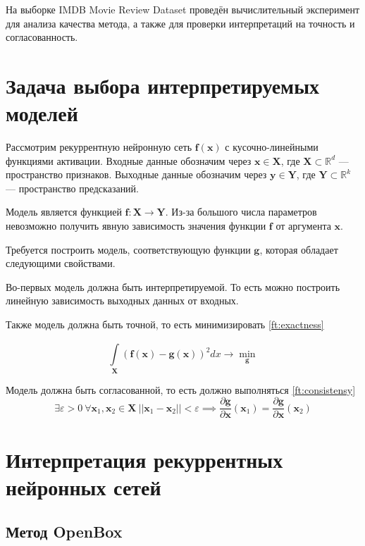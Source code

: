 \documentclass[a4paper, 12pt]{article}
\begin{document}
На выборке IMDB Movie Review Dataset \cite{maas-EtAl:2011:ACL-HLT2011} проведён вычислительный эксперимент для анализа качества метода, а также для проверки интерпретаций на точность и согласованность. 

\section{Задача выбора интерпретируемых моделей}
Рассмотрим рекуррентную нейронную сеть $\mathbf{f}(\mathbf{x})$ с кусочно-линейными функциями активации. Входные данные обозначим через $\mathbf{x} \in \mathbf{X}$, где $\mathbf{X} \subset \mathbb{R}^d$ --- пространство признаков. Выходные данные обозначим через $\mathbf{y} \in \mathbf{Y}$, где $\mathbf{Y} \subset \mathbb{R}^k$ --- пространство предсказаний.

Модель является функцией $\mathbf{f}: \mathbf{X} \to \mathbf{Y}$. Из-за большого числа параметров невозможно получить явную зависимость значения функции $\mathbf{f}$ от аргумента $\mathbf{x}$.

Требуется построить модель, соответствующую функции $\mathbf{g}$, которая обладает следующими свойствами.

Во-первых модель должна быть интерпретируемой. То есть можно построить линейную зависимость выходных данных от входных.

Также модель должна быть точной, то есть минимизировать \eqref{ft:exactness}

\begin{equation}\label{ft:exactness}
\int\limits_{\mathbf{X}}^{}{\left(\mathbf{f}(\mathbf{x}) - \mathbf{g}(\mathbf{x})\right)^2dx} \to \min_{\mathbf{g}}
\end{equation}

Модель должна быть согласованной, то есть должно выполняться \eqref{ft:consistensy}
\begin{equation}\label{ft:consistensy}
\exists \varepsilon > 0\: \forall \mathbf{x}_1, \mathbf{x}_2 \in \mathbf{X}\: ||\mathbf{x}_1-\mathbf{x}_2||<\varepsilon \implies \frac{\partial{\mathbf{g}}}{\partial{\mathbf{x}}}(\mathbf{x}_1)=\frac{\partial{\mathbf{g}}}{\partial{\mathbf{x}}}(\mathbf{x}_2)
\end{equation}

\section{Интерпретация рекуррентных нейронных сетей}

\subsection{Метод OpenBox}
\end{document}
